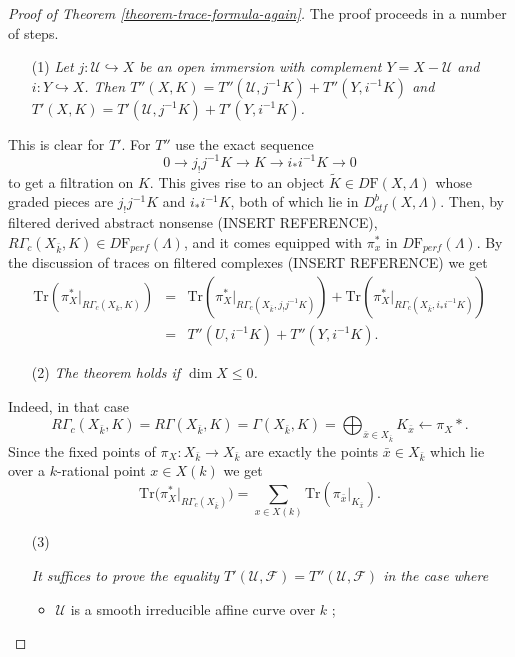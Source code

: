 \begin{proof}[Proof of Theorem \ref{theorem-trace-formula-again}]
The proof proceeds in a number of steps.
\begin{enumerate}
\item[(1)]
{\it Let $j: \mathcal{U}\hookrightarrow X$ be an open immersion with complement
$Y = X - \mathcal{U}$ and $i: Y \hookrightarrow X$. Then
$T''(X, K) = T''(\mathcal{U}, j^{-1} K)+ T''(Y, i^{-1}K)$ and
$T'(X, K) = T'(\mathcal{U}, j^{-1} K)+ T'(Y, i^{-1}K)$.}
\end{enumerate}
This is clear for $T'$. For $T''$ use the exact sequence
$$
0\to j_!j^{-1} K \to K \to i_* i^{-1} K \to 0
$$
to get a filtration on $K$. This gives rise to an object
$\widetilde K \in D\mathrm{F}(X, \Lambda)$
whose graded pieces are $j_!j^{-1}K$ and $i_*i^{-1}K$,
both of which lie in $D_{ctf}^b(X, \Lambda)$. Then, by filtered derived
abstract nonsense (INSERT REFERENCE),
$R\Gamma_c(X_{\bar k}, K)\in D\mathrm{F}_{perf}(\Lambda)$,
and it comes equipped with $\pi_x^*$ in
$D\mathrm{F}_{perf}(\Lambda)$.
By the discussion of traces on filtered complexes (INSERT REFERENCE) we get
\begin{eqnarray*}
\text{Tr}\left(\pi_X^*\big|_{R\Gamma_c(X_{\bar k}, K)}\right)
& = & \text{Tr}\left(\pi_X^*\big|_{R\Gamma_c(X_{\bar k}, j_!j^{-1}K)}\right)+
\text{Tr}\left(\pi_X^*\big|_{R\Gamma_c(X_{\bar k}, i_*i^{-1}K)}\right)
\\
& = & T''(U, i^{-1}K) + T''(Y, i^{-1}K).
\end{eqnarray*}
\begin{enumerate}
\item[(2)]
{\it The theorem holds if $\dim X\leq 0$. }
\end{enumerate}
Indeed, in that case
$$
R\Gamma_c(X_{\bar k}, K) = R\Gamma(X_{\bar k}, K) = \Gamma(X_{\bar k}, K) =
\bigoplus_{\bar x\in X_{\bar k}} K_{\bar x} \leftarrow \pi_X*.
$$
Since the fixed points of $\pi_X: X_{\bar k}\to X_{\bar k}$ are exactly the
points $\bar x\in X_{\bar k}$ which lie over a $k$-rational point $x\in X(k)$
we get
$$
\text{Tr}\big(\pi_X^*|_{R\Gamma_c(X_{\bar k})}\big) = \sum_{x\in
X(k)}\text{Tr}(\pi_{\bar x}|_{K_{\bar x}}).
$$
\begin{enumerate}
\item[(3)]
{\it It suffices to prove the equality $T'(\mathcal{U}, \mathcal{F}) =
T''(\mathcal{U}, \mathcal{F})$ in the case where
\begin{itemize}
\item $\mathcal{U}$ is a smooth irreducible affine curve over $k$ ;

\end{itemize}}
\end{enumerate}
\end{proof}
